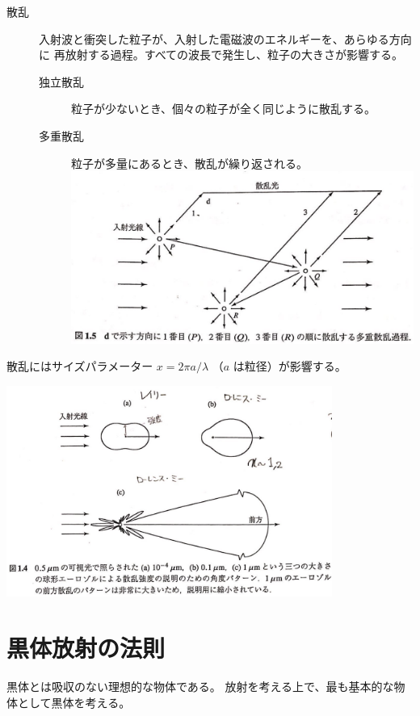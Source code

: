 \documentclass[article]{dennou777}
\newcommand{\centeralign}[1]{\rule{0pt}{0pt}\hfill#1\hfill\rule{0pt}{0pt}}
\begin{document}
\begin{description}
	\item[散乱] 入射波と衝突した粒子が、入射した電磁波のエネルギーを、あらゆる方向に
		再放射する過程。すべての波長で発生し、粒子の大きさが影響する。
		\begin{description}
			\item[独立散乱] 粒子が少ないとき、個々の粒子が全く同じように散乱する。
			\item[多重散乱] 粒子が多量にあるとき、散乱が繰り返される。\\
				\includegraphics[width=\linewidth]{mscatter.jpg}
		\end{description}
\end{description}

散乱にはサイズパラメーター $x=2\pi a/\lambda$ （$a$ は粒径）が影響する。

\centeralign{\includegraphics[width=0.8\textwidth]{scatter.jpg}}

\section{黒体放射の法則}

黒体とは吸収のない理想的な物体である。
放射を考える上で、最も基本的な物体として黒体を考える。
\end{document}
